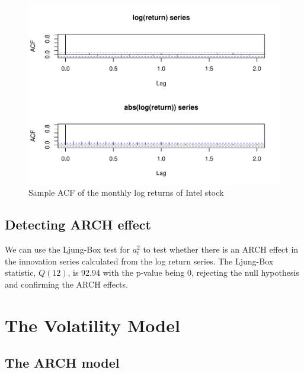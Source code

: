 \documentclass[a4paper,11pt]{article}\usepackage[]{graphicx}\usepackage[]{color}
\makeatletter
\def\maxwidth{ %
  \ifdim\Gin@nat@width>\linewidth
    \linewidth
  \else
    \Gin@nat@width
  \fi
}
\newenvironment{knitrout}{}{} %
\makeatother
\begin{document}
\begin{knitrout}
\color{fgcolor}\begin{figure}

{\centering \includegraphics[width=\maxwidth]{figure/plot-acf-1} 

}

\caption[Sample ACF of the monthly log returns of Intel stock]{Sample ACF of the monthly log returns of Intel stock}\label{fig:plot-acf}
\end{figure}


\end{knitrout}

\subsection*{Detecting ARCH effect}



We can use the Ljung-Box test for {$a^2_t$} to test whether there is an ARCH effect in the innovation series calculated from the log return series. The Ljung-Box statistic, $Q(12)$, is 92.94 with the p-value being 0, rejecting the null hypothesis and confirming the ARCH effects. 

\section{The Volatility Model}
\label{sec:volatility_model}

\subsection*{The ARCH model}
\end{document}
